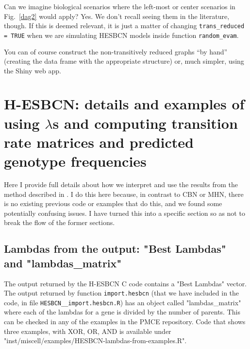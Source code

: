 \documentclass[a4paper,11pt]{article}
\begin{document}




Can we imagine biological scenarios where the left-most or center scenarios in Fig.~\ref{dag2} would apply? Yes. We don't recall seeing them in the literature, though. If this is deemed relevant, it is just a matter of changing  \texttt{trans\_reduced = TRUE} when we are simulating HESBCN models inside function \texttt{random\_evam}.

You can of course construct the non-transitively reduced graphs ``by hand'' (creating the data frame with the appropriate structure) or, much simpler, using the Shiny web app.



\section{H-ESBCN: details and examples of using $\lambda$s and computing transition rate matrices and predicted genotype frequencies}\label{hesbcn}

Here I provide full details about how we interpret and use the results from the method described in \cite{angaroni2021}. I do this here because, in contrast to CBN or MHN, there is no existing previous code or examples that do this, and we found some potentially confusing issues. I have turned this into a specific section so as not to break the flow of the former sections.


\subsection{Lambdas from the output: "Best Lambdas" and "lambdas\_matrix"}

The output returned by the H-ESBCN C code contains a "Best Lambdas" vector. The output returned by function \texttt{import.hesbcn} (that we have included in the code, in file \texttt{HESBCN\_\_import.hesbcn.R}) has an object called "lambdas\_matrix" where each of the lambdas for a gene is divided by the number of parents. This can be checked in any of the examples in the PMCE repository. Code that shows three examples, with XOR, OR, AND is available under "inst/miscell/examples/HESBCN-lambdas-from-examples.R".
\end{document}
